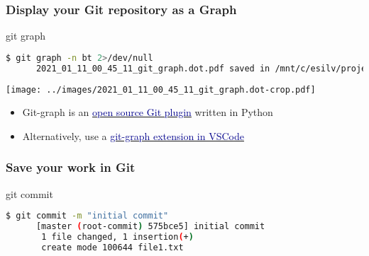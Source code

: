 \begin{frame}[fragile]\frametitle{Display your Git repository as a Graph}
   \begin{center}
      \Huge git graph \normalsize
   \end{center}
   \begin{lstlisting}[language=bash, style=bash]
      $ git graph -n bt 2>/dev/null
      2021_01_11_00_45_11_git_graph.dot.pdf saved in /mnt/c/esilv/project/.gitGraph
   \end{lstlisting}
   \vspace{1em}
   \begin{center}
      \texttt{[image: ../images/2021\_01\_11\_00\_45\_11\_git\_graph.dot-crop.pdf]}
   \end{center}
   \vspace{1em}
   \begin{itemize}
      \item Git-graph is an \href{https://github.com/hoduche/git-graph}
   {\textcolor{DarkBlue}{open source Git plugin}} written in Python
      \item Alternatively, use a \href{https://marketplace.visualstudio.com/items?itemName=mhutchie.git-graph}
   {\textcolor{DarkBlue}{git-graph extension in VSCode}}
   \end{itemize}
\end{frame}

\begin{frame}[fragile]\frametitle{Save your work in Git}
   \begin{center}
      \Huge git commit \normalsize
   \end{center}
   \begin{lstlisting}[language=bash, style=bash]
      $ git commit -m "initial commit"
      [master (root-commit) 575bce5] initial commit
       1 file changed, 1 insertion(+)
       create mode 100644 file1.txt
   \end{lstlisting}
\end{frame}

